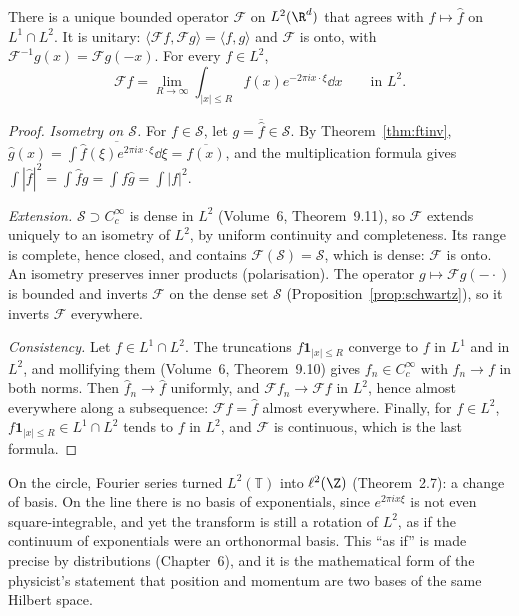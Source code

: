 \begin{theorem}[Plancherel, 1910]\label{thm:plancherel}
There is a unique bounded operator $\mathcal F$ on $L^2(\R^d)$ that agrees with $f\mapsto\hat f$ on $L^1\cap L^2$. It is unitary: $\langle\mathcal Ff,\mathcal Fg\rangle=\langle f,g\rangle$ and $\mathcal F$ is onto, with
$\mathcal F^{-1}g(x)=\mathcal Fg(-x)$. For every $f\in L^2$,
\[\mathcal Ff=\lim_{R\to\infty}\int_{|x|\le R}f(x)e^{-2\pi ix\cdot\xi}\dd x\qquad\text{in }L^2.\]
\end{theorem}
\begin{proof}
\emph{Isometry on $\mathcal S$.} For $f\in\mathcal S$, let $g=\overline{\hat f}\in\mathcal S$. By Theorem~\ref{thm:ftinv},
$\hat g(x)=\overline{\int\hat f(\xi)e^{2\pi ix\cdot\xi}\dd\xi}=\overline{f(x)}$, and the multiplication formula gives $\int|\hat f|^2=\int\hat fg=\int f\hat g=\int|f|^2$.

\emph{Extension.} $\mathcal S\supset C_c^\infty$ is dense in $L^2$ (Volume~6, Theorem~9.11), so $\mathcal F$ extends uniquely to an isometry of $L^2$, by uniform continuity and completeness. Its range is complete,
hence closed, and contains $\mathcal F(\mathcal S)=\mathcal S$, which is dense: $\mathcal F$ is onto. An isometry preserves inner products (polarisation). The operator $g\mapsto\mathcal Fg(-\cdot)$ is bounded and inverts
$\mathcal F$ on the dense set $\mathcal S$ (Proposition~\ref{prop:schwartz}), so it inverts $\mathcal F$ everywhere.

\emph{Consistency.} Let $f\in L^1\cap L^2$. The truncations $f\mathbf 1_{|x|\le R}$ converge to $f$ in $L^1$ and in $L^2$, and mollifying them (Volume~6, Theorem~9.10) gives $f_n\in C_c^\infty$ with $f_n\to f$ in both norms.
Then $\hat f_n\to\hat f$ uniformly, and $\mathcal Ff_n\to\mathcal Ff$ in $L^2$, hence almost everywhere along a subsequence: $\mathcal Ff=\hat f$ almost everywhere. Finally, for $f\in L^2$, $f\mathbf 1_{|x|\le R}\in L^1\cap L^2$
tends to $f$ in $L^2$, and $\mathcal F$ is continuous, which is the last formula.
\end{proof}

\begin{beauty}
On the circle, Fourier series turned $L^2(\mathbb T)$ into $\ell^2(\Z)$ (Theorem~2.7): a change of basis. On the line there is no basis
of exponentials, since $e^{2\pi ix\xi}$ is not even square-integrable, and yet the transform is still a rotation of $L^2$, as if the
continuum of exponentials were an orthonormal basis. This ``as if'' is made precise by distributions (Chapter~6), and it is the
mathematical form of the physicist's statement that position and momentum are two bases of the same Hilbert space.
\end{beauty}

